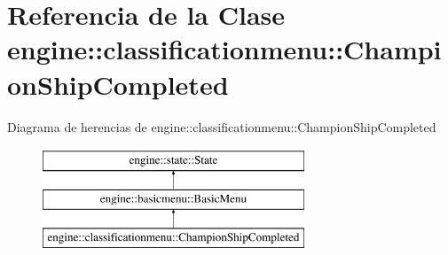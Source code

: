 \hypertarget{classengine_1_1classificationmenu_1_1ChampionShipCompleted}{
\section{\-Referencia de la \-Clase engine\-:\-:classificationmenu\-:\-:\-Champion\-Ship\-Completed}
\label{classengine_1_1classificationmenu_1_1ChampionShipCompleted}
}
\-Diagrama de herencias de engine\-:\-:classificationmenu\-:\-:\-Champion\-Ship\-Completed\begin{figure}[H]
\begin{center}
\leavevmode
\includegraphics[height=3.000000cm]{classengine_1_1classificationmenu_1_1ChampionShipCompleted}
\end{center}
\end{figure}
